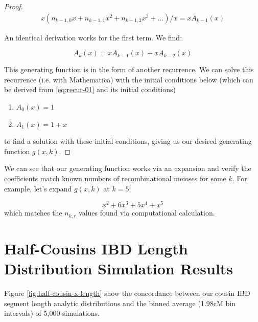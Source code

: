 \documentclass[9pt,twocolumn,twoside]{gsajnl}
\begin{document}
\begin{proof}
 \begin{align*}
   x(n_{k-1, 0} x + n_{k-1, 1} x^2 + n_{k-1, 2} x^3 + \ldots)/x = x A_{k-1}(x) 
 \end{align*}

 An identical derivation works for the first term. We find:

 \begin{equation*} \label{eq:rec-gen}
   A_k(x) = xA_{k-1}(x) + xA_{k-2}(x)
 \end{equation*}

This generating function is in the form of another recurrence. We can solve
this recurrence (i.e. with Mathematica) with the initial conditions below
(which can be derived from \eqref{eq:recur-01} and its initial conditions)
%
\begin{enumerate}
  \item $ A_0(x) = 1 $
  \item $ A_1(x) = 1 + x $
\end{enumerate}
%
to find a solution with these initial conditions, giving us our desired
generating function $g(x,k)$.

\end{proof}

We can see that our generating function works via an expansion and verify
the coefficients match known numbers of recombinational meioses for some $k$.
For example, let's expand $g(x, k)$ at $k=5$:

\begin{equation*}
  x^2 + 6x^3 + 5x^4 + x^5
\end{equation*}
%
which matches the $n_{k,r}$ values found via computational calculation.

\section*{Half-Cousins IBD Length Distribution Simulation Results}

Figure \ref{fig:half-cousin-x-length} show the concordance between our cousin
IBD segment length analytic distributions and the binned average (1.98cM bin
intervals) of 5,000 simulations.
\end{document}
